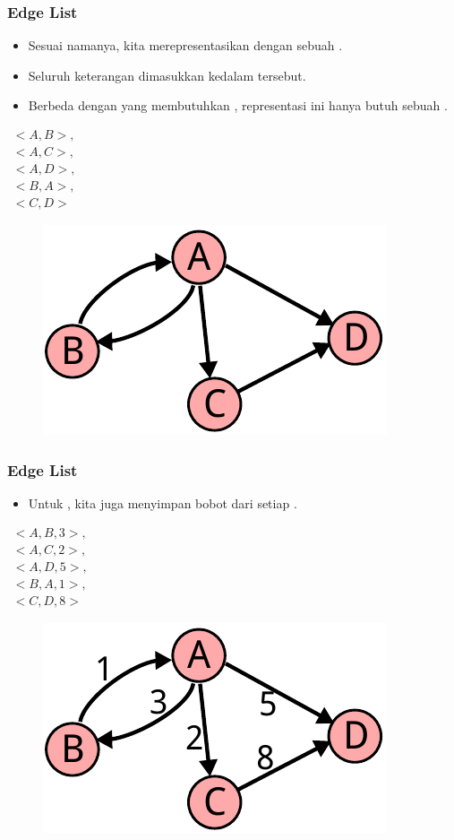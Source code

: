\begin{frame}
\frametitle{Edge List}
\begin{itemize}
  \item Sesuai namanya, kita merepresentasikan \fgraph dengan sebuah \flist.
  \item Seluruh keterangan \fedge dimasukkan kedalam \flist tersebut.
  \item Berbeda dengan \fadjacencylist yang membutuhkan , representasi ini hanya butuh sebuah \flist.
\end{itemize}
\begin{center}
\begin{multicols}{2}
  $\begin{array}{l}
    <A, B>, \\
    <A, C>, \\
    <A, D>, \\
    <B, A>, \\
    <C, D> 
  \end{array}$
  \break
  \begin{figure}
    \includegraphics[width=4 cm]{asset/unweighted-directed.pdf}
  \end{figure}
\end{multicols} 
\end{center}
\end{frame}

\begin{frame}
\frametitle{Edge List}
\begin{itemize}
  \item Untuk  \fgraph, kita juga menyimpan bobot dari setiap \fedge.
\end{itemize}
\begin{center}
\begin{multicols}{2}
  $\begin{array}{l}
    <A, B, 3>, \\
    <A, C, 2>, \\
    <A, D, 5>, \\
    <B, A, 1>, \\
    <C, D, 8> 
  \end{array}$
  \break
  \begin{figure}
    \includegraphics[width=4 cm]{asset/weighted-directed.pdf}
  \end{figure}
\end{multicols} 
\end{center}
\end{frame}

